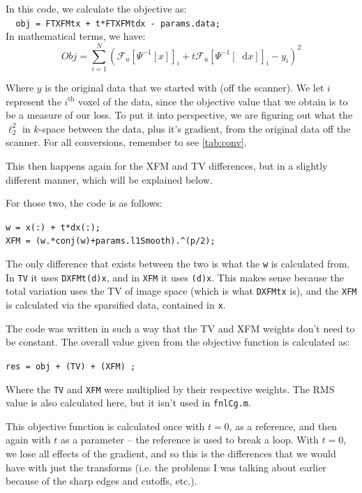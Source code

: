 \documentclass[11 pt]{article}
\newcommand*\diff{\mathop{}\!\mathrm{d}}
\begin{document}
            \noindent In this code, we calculate the objective as:\\
            \verb!  obj = FTXFMtx + t*FTXFMtdx - params.data;!\\

            \noindent In mathematical terms, we have:
            \[ Obj = \sum\limits_{i=1}^N \left(\mathcal{F}_u[\Psi^{-1}[x]]_i + t\mathcal{F}_u[\Psi^{-1}[\diff x]]_i - y_i\right)^2 \]

            Where $y$ is the original data that we started with (off the scanner). We let $i$ represent the $i^{\text{th}}$ voxel of the data, since the objective value that we obtain is to be a measure of our loss. To put it into perspective, we are figuring out what the $\ell_2^2$ in $k$-space between the data, plus it's gradient, from the original data off the scanner. For all conversions, remember to see \autoref{tab:conv}.

            This then happens again for the XFM and TV differences, but in a slightly different manner, which will be explained below. 

            For those two, the code is as follows:

            \verb!w = x(:) + t*dx(:);!\\ 
            \verb!XFM = (w.*conj(w)+params.l1Smooth).^(p/2);!

            The only difference that exists between the two is what the \texttt{w} is calculated from. In \texttt{TV} it uses \texttt{DXFMt(d)x}, and in \texttt{XFM} it uses \texttt{(d)x}. This makes sense because the total variation uses the TV of image space (which is what \texttt{DXFMtx} is), and the \texttt{XFM} is calculated via the sparsified data, contained in \texttt{x}.

            The code was written in such a way that the TV and XFM weights don't need to be constant. The overall value given from the objective function is calculated as:

            \verb!res = obj + (TV) + (XFM) ;!

            Where the \texttt{TV} and \texttt{XFM} were multiplied by their respective weights. The RMS value is also calculated here, but it isn't used in \texttt{fnlCg.m}.

            This objective function is calculated once with $t=0$, as a reference, and then again with $t$ as a parameter -- the reference is used to break a loop. With $t = 0$, we lose all effects of the gradient, and so this is the differences that we would have with just the transforms (i.e. the problems I was talking about earlier because of the sharp edges and cutoffs, etc.).\\\\
\end{document}
